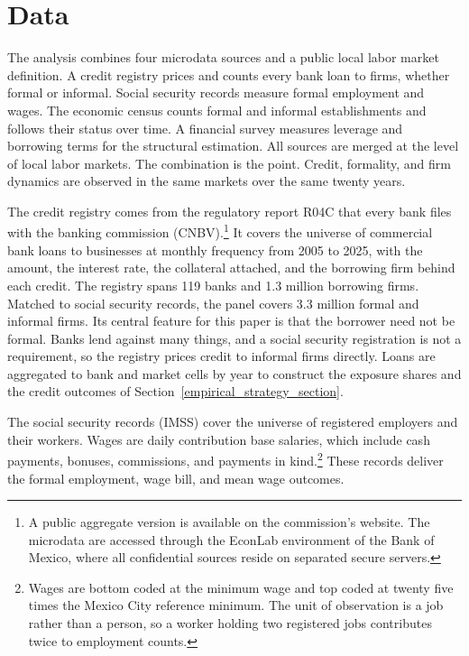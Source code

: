 \documentclass[12pt]{article}
\begin{document}
\section{Data}
\label{sec:data}

The analysis combines four microdata sources and a public local labor market definition. A credit registry prices and counts every bank loan to firms, whether formal or informal. Social security records measure formal employment and wages. The economic census counts formal and informal establishments and follows their status over time. A financial survey measures leverage and borrowing terms for the structural estimation. All sources are merged at the level of local labor markets. The combination is the point. Credit, formality, and firm dynamics are observed in the same markets over the same twenty years.

The credit registry comes from the regulatory report R04C that every bank files with the banking commission (CNBV).\footnote{A public aggregate version is available on the commission's website. The microdata are accessed through the EconLab environment of the Bank of Mexico, where all confidential sources reside on separated secure servers.} It covers the universe of commercial bank loans to businesses at monthly frequency from 2005 to 2025, with the amount, the interest rate, the collateral attached, and the borrowing firm behind each credit. The registry spans 119 banks and 1.3 million borrowing firms. Matched to social security records, the panel covers 3.3 million formal and informal firms. Its central feature for this paper is that the borrower need not be formal. Banks lend against many things, and a social security registration is not a requirement, so the registry prices credit to informal firms directly. Loans are aggregated to bank and market cells by year to construct the exposure shares and the credit outcomes of Section~\ref{empirical_strategy_section}.

The social security records (IMSS) cover the universe of registered employers and their workers. Wages are daily contribution base salaries, which include cash payments, bonuses, commissions, and payments in kind.\footnote{Wages are bottom coded at the minimum wage and top coded at twenty five times the Mexico City reference minimum. The unit of observation is a job rather than a person, so a worker holding two registered jobs contributes twice to employment counts.} These records deliver the formal employment, wage bill, and mean wage outcomes.
\end{document}
